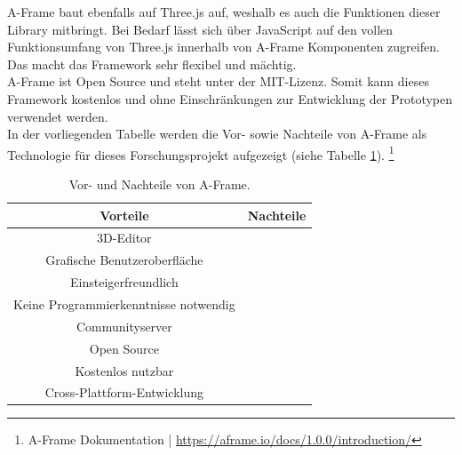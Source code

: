 \documentclass[a4paper,12pt,oneside]{article}
\begin{document}
        A-Frame baut ebenfalls auf Three.js auf, weshalb es auch die Funktionen
        dieser Library mitbringt. Bei Bedarf lässt sich über JavaScript auf 
        den vollen Funktionsumfang von Three.js innerhalb von A-Frame Komponenten
        zugreifen. Das macht das Framework sehr flexibel und mächtig. \\
        A-Frame ist Open Source und steht unter der MIT-Lizenz. Somit kann dieses
        Framework kostenlos und ohne Einschränkungen zur Entwicklung der 
        Prototypen verwendet werden. \\
        In der vorliegenden Tabelle werden die Vor- sowie Nachteile von A-Frame als
        Technologie für dieses Forschungsprojekt aufgezeigt (siehe Tabelle \ref{tab:vor-und-nachteile-aframe}).
        \footnote{A-Frame Dokumentation | \url{https://aframe.io/docs/1.0.0/introduction/}}
        \begin{table}[h]
          \begin{center}
            \begin{tabular}{| c | c |}
              \hline
              \textbf{Vorteile} & \textbf{Nachteile} \\ \hline
              3D-Editor & \\ \hline
              Grafische Benutzeroberfläche & \\ \hline
              Einsteigerfreundlich & \\ \hline
              Keine Programmierkenntnisse notwendig & \\ \hline
              Communityserver & \\ \hline
              Open Source & \\ \hline
              Kostenlos nutzbar & \\ \hline
              Cross-Plattform-Entwicklung & \\ 
              \hline
            \end{tabular}
            \caption{Vor- und Nachteile von A-Frame.\label{tab:vor-und-nachteile-aframe}}
          \end{center}
        \end{table}
\end{document}
